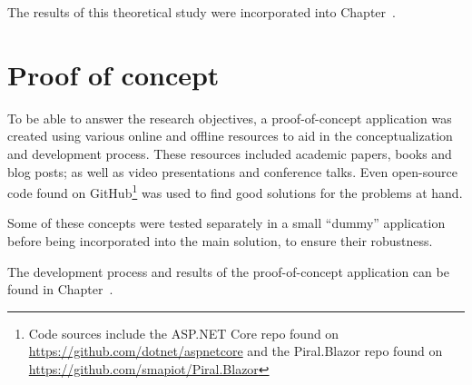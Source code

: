 The results of this theoretical study were incorporated into
Chapter~. 



\section{Proof of concept}

To be able to answer the research objectives, a proof-of-concept application was
created using various online and offline resources to aid in the
conceptualization and development process. These resources included academic
papers, books and blog posts; as well as video presentations and conference
talks. Even open-source code found on GitHub\footnote{Code sources include the
ASP.NET Core repo found on \url{https://github.com/dotnet/aspnetcore} and the
Piral.Blazor repo found on \url{https://github.com/smapiot/Piral.Blazor}} was
used to find good solutions for the problems at hand.

Some of these concepts were tested separately in a small ``dummy'' application
before being incorporated into the main solution, to ensure their robustness.

The development process and results of the proof-of-concept application can be
found in Chapter~.